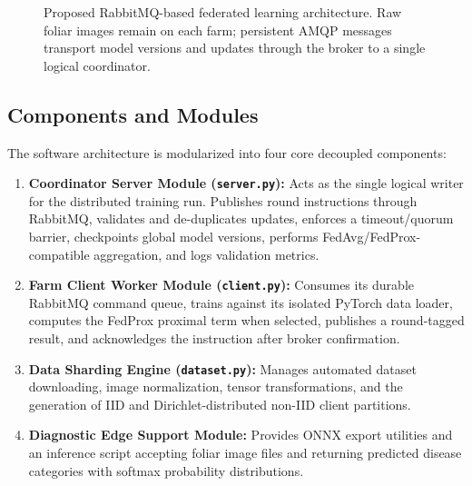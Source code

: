 \documentclass[applsci,article,submit,oneauthor,pdftex]{Definitions/mdpi}
\begin{document}
\begin{figure}[!ht]
{
}
\caption{Proposed RabbitMQ-based federated learning architecture. Raw foliar images remain on each farm; persistent AMQP messages transport model versions and updates through the broker to a single logical coordinator.}
\label{fig:architecture}
\end{figure}

\subsection{Components and Modules}
The software architecture is modularized into four core decoupled components:
\begin{enumerate}[leftmargin=*]
    \item \textbf{Coordinator Server Module (\texttt{server.py}):} Acts as the single logical writer for the distributed training run. Publishes round instructions through RabbitMQ, validates and de-duplicates updates, enforces a timeout/quorum barrier, checkpoints global model versions, performs FedAvg/FedProx-compatible aggregation, and logs validation metrics.
    \item \textbf{Farm Client Worker Module (\texttt{client.py}):} Consumes its durable RabbitMQ command queue, trains against its isolated PyTorch data loader, computes the FedProx proximal term when selected, publishes a round-tagged result, and acknowledges the instruction after broker confirmation.
    \item \textbf{Data Sharding Engine (\texttt{dataset.py}):} Manages automated dataset downloading, image normalization, tensor transformations, and the generation of IID and Dirichlet-distributed non-IID client partitions.
    \item \textbf{Diagnostic Edge Support Module:} Provides ONNX export utilities and an inference script accepting foliar image files and returning predicted disease categories with softmax probability distributions.
\end{enumerate}
\end{document}
